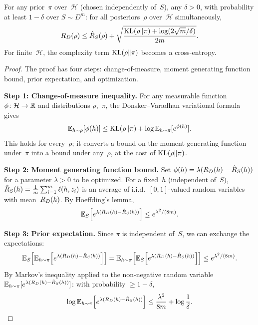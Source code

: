 \begin{thm}
\label{thm:pac-bayes}
For any prior~$\pi$ over~$\mathcal{H}$ (chosen independently of~$S$),
any $\delta > 0$, with probability at least $1 - \delta$ over
$S \sim D^m$: for all posteriors~$\rho$ over~$\mathcal{H}$
simultaneously,
\[
  R_D(\rho) \leq \hat{R}_S(\rho)
    + \sqrt{\frac{\mathrm{KL}(\rho \| \pi) + \log(2\sqrt{m}/\delta)}{2m}}.
\]
For finite~$\mathcal{H}$, the complexity term $\mathrm{KL}(\rho\|\pi)$ becomes a
cross-entropy.
\end{thm}

\begin{proof}
The proof has four steps: change-of-measure, moment generating function
bound, prior expectation, and optimization.

\textbf{Step 1: Change-of-measure inequality.}
For any measurable function $\phi \colon \mathcal{H} \to \mathbb{R}$ and
distributions $\rho$,~$\pi$, the Donsker--Varadhan variational formula
gives
\[
  \mathbb{E}_{h \sim \rho}[\phi(h)] \leq \mathrm{KL}(\rho \| \pi)
    + \log \mathbb{E}_{h \sim \pi}[e^{\phi(h)}].
\]
This holds for every~$\rho$; it converts a bound on the moment generating
function under~$\pi$ into a bound under any~$\rho$, at the cost of
$\mathrm{KL}(\rho \| \pi)$.

\textbf{Step 2: Moment generating function bound.}
Set $\phi(h) = \lambda(R_D(h) - \hat{R}_S(h))$ for a parameter
$\lambda > 0$ to be optimized.  For a fixed~$h$ (independent of~$S$),
$\hat{R}_S(h) = \frac{1}{m}\sum_{i=1}^m \ell(h, z_i)$ is an average of
i.i.d.\ $[0,1]$-valued random variables with mean~$R_D(h)$.  By
Hoeffding's lemma,
\[
  \mathbb{E}_S\!\left[e^{\lambda(R_D(h) - \hat{R}_S(h))}\right]
  \leq e^{\lambda^2/(8m)}.
\]

\textbf{Step 3: Prior expectation.}
Since $\pi$ is independent of~$S$, we can exchange the expectations:
\[
  \mathbb{E}_S\!\left[\mathbb{E}_{h \sim \pi}\!\left[
    e^{\lambda(R_D(h) - \hat{R}_S(h))}\right]\right]
  = \mathbb{E}_{h \sim \pi}\!\left[\mathbb{E}_S\!\left[
    e^{\lambda(R_D(h) - \hat{R}_S(h))}\right]\right]
  \leq e^{\lambda^2/(8m)}.
\]
By Markov's inequality applied to the non-negative random variable
$\mathbb{E}_{h \sim \pi}[e^{\lambda(R_D(h) - \hat{R}_S(h))}]$: with
probability $\geq 1 - \delta$,
\[
  \log \mathbb{E}_{h \sim \pi}\!\left[
    e^{\lambda(R_D(h) - \hat{R}_S(h))}\right]
  \leq \frac{\lambda^2}{8m} + \log\frac{1}{\delta}.
\]


\end{proof}
